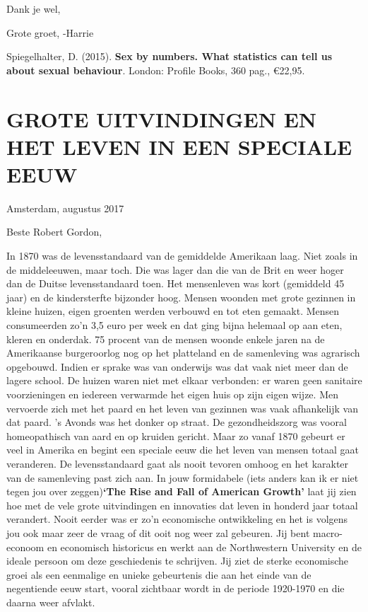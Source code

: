 \documentclass[]{book}
\begin{document}
Dank je wel,

Grote groet, -Harrie

Spiegelhalter, D. (2015). \textbf{Sex by numbers. What statistics can
tell us about sexual behaviour}. London: Profile Books, 360 pag.,
€22,95.

\hypertarget{grote-uitvindingen-en-het-leven-in-een-speciale-eeuw}{%
\chapter*{GROTE UITVINDINGEN EN HET LEVEN IN EEN SPECIALE
EEUW}\label{grote-uitvindingen-en-het-leven-in-een-speciale-eeuw}}

Amsterdam, augustus 2017

Beste Robert Gordon,

In 1870 was de levensstandaard van de gemiddelde Amerikaan laag. Niet
zoals in de middeleeuwen, maar toch. Die was lager dan die van de Brit
en weer hoger dan de Duitse levensstandaard toen. Het mensenleven was
kort (gemiddeld 45 jaar) en de kindersterfte bijzonder hoog. Mensen
woonden met grote gezinnen in kleine huizen, eigen groenten werden
verbouwd en tot eten gemaakt. Mensen consumeerden zo'n 3,5 euro per week
en dat ging bijna helemaal op aan eten, kleren en onderdak. 75 procent
van de mensen woonde enkele jaren na de Amerikaanse burgeroorlog nog op
het platteland en de samenleving was agrarisch opgebouwd. Indien er
sprake was van onderwijs was dat vaak niet meer dan de lagere school. De
huizen waren niet met elkaar verbonden: er waren geen sanitaire
voorzieningen en iedereen verwarmde het eigen huis op zijn eigen wijze.
Men vervoerde zich met het paard en het leven van gezinnen was vaak
afhankelijk van dat paard. 's Avonds was het donker op straat. De
gezondheidszorg was vooral homeopathisch van aard en op kruiden gericht.
Maar zo vanaf 1870 gebeurt er veel in Amerika en begint een speciale
eeuw die het leven van mensen totaal gaat veranderen. De levensstandaard
gaat als nooit tevoren omhoog en het karakter van de samenleving past
zich aan. In jouw formidabele (iets anders kan ik er niet tegen jou over
zeggen)\textbf{`The Rise and Fall of American Growth'} laat jij zien hoe
met de vele grote uitvindingen en innovaties dat leven in honderd jaar
totaal verandert. Nooit eerder was er zo'n economische ontwikkeling en
het is volgens jou ook maar zeer de vraag of dit ooit nog weer zal
gebeuren. Jij bent macro-econoom en economisch historicus en werkt aan
de Northwestern University en de ideale persoon om deze geschiedenis te
schrijven. Jij ziet de sterke economische groei als een eenmalige en
unieke gebeurtenis die aan het einde van de negentiende eeuw start,
vooral zichtbaar wordt in de periode 1920-1970 en die daarna weer
afvlakt.
\end{document}
